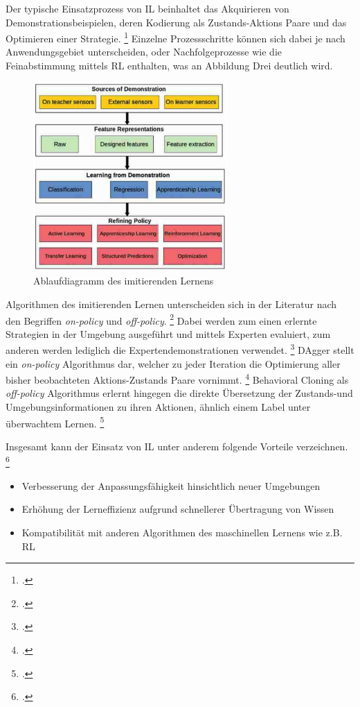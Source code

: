 Der typische Einsatzprozess von IL beinhaltet das Akquirieren von Demonstrationsbeispielen, deren Kodierung als Zustands-Aktions Paare und das Optimieren einer Strategie. \footcite[Vgl.][S. 3]{Hussein.2017}
Einzelne Prozessschritte können sich dabei je nach Anwendungsgebiet unterscheiden, oder Nachfolgeprozesse wie die Feinabstimmung mittels RL enthalten, was an Abbildung Drei deutlich wird.
\begin{figure}[htb]
    \centering
    \includegraphics[height=7.2cm]{lib/graphics/IL flowchart.png}
    \caption[Ablaufdiagramm des imitierenden Lernens]{Ablaufdiagramm des imitierenden Lernens\footnotemark}
    \label{abb:IL-process-flowchart}
\end{figure}

Algorithmen des imitierenden Lernen unterscheiden sich in der Literatur nach den Begriffen \textit{on-policy} und \textit{off-policy}. \footcite[Vgl.][S. 3]{Ashwin.2020}
Dabei werden zum einen erlernte Strategien in der Umgebung ausgeführt und mittels Experten evaluiert, zum anderen werden lediglich die Expertendemonstrationen verwendet. \footcite[Vgl.][S. 3]{Ashwin.2020}
DAgger stellt ein \textit{on-policy} Algorithmus dar, welcher zu jeder Iteration die Optimierung aller bisher beobachteten Aktions-Zustands Paare vornimmt. \footcite[Vgl.][S. 5]{attia.2018}
Behavioral Cloning als \textit{off-policy} Algorithmus erlernt hingegen die direkte Übersetzung der Zustands-und Umgebungsinformationen zu ihren Aktionen, ähnlich einem Label unter überwachtem Lernen. \footcite[Vgl.][S. 4]{fang.2019}

Insgesamt kann der Einsatz von IL unter anderem folgende Vorteile verzeichnen. \footcite[Vgl.][S. 1]{fang.2019}
\begin{itemize}
    \item Verbesserung der Anpassungsfähigkeit hinsichtlich neuer Umgebungen
    \item Erhöhung der Lerneffizienz aufgrund schnellerer Übertragung von Wissen
    \item Kompatibilität mit anderen Algorithmen des maschinellen Lernens wie z.B. RL
\end{itemize}

